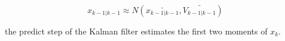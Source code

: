 \documentclass[mscthesis]{usiinfthesis}
\begin{document}
\[
x_{k-1 | k-1} \approx N(\bar{x_{k-1 | k-1}}, \bar{V_{k-1|k-1}})
\]

the predict step of the Kalman filter estimates the first two moments of $x_k$. 




%


%
 
\end{document}
